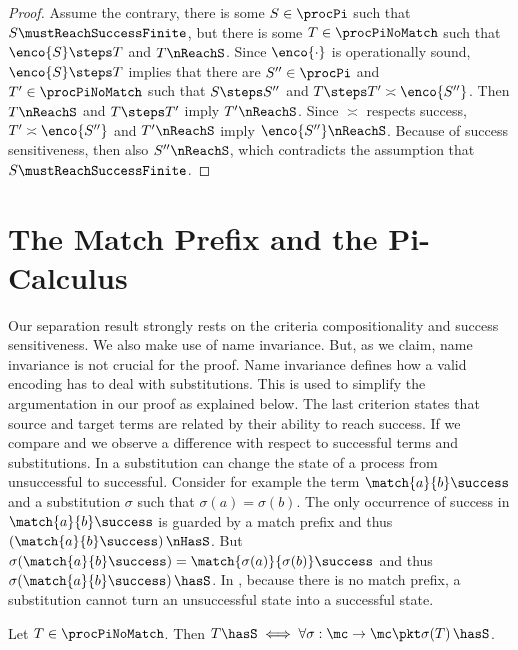 \documentclass[]{article}
\begin{document}
\begin{proof}
	Assume the contrary, \ie there is some $ S \in \procPi $ such that $ S \mustReachSuccessFinite $, but there is some $ T \in \procPiNoMatch $ such that $ \enco{S} \steps T $ and $ T \nReachS $.
	Since $ \enco{\cdot} $ is operationally sound, $ \enco{S} \steps T $ implies that there are $ S'' \in \procPi $ and $ T' \in \procPiNoMatch $ such that $ S \steps S'' $ and $ T \steps T' \asymp \enco{S''} $. Then $ T \nReachS $ and $ T \steps T' $ imply $ T' \nReachS $. Since $ \asymp $ respects success, $ T' \asymp \enco{S''} $ and $ T' \nReachS $ imply $ \enco{S''} \nReachS $. Because of success sensitiveness, then also $ S'' \nReachS $, which contradicts the assumption that $ S\mustReachSuccessFinite $.
\end{proof}



\section{The Match Prefix and the Pi-Calculus}
\label{sec:encodeMatch}

Our separation result strongly rests on the criteria compositionality and success sensitiveness.
We also make use of name invariance.
But, as we claim, name invariance is not crucial for the proof. Name invariance defines how a valid encoding has to deal with substitutions. This is used to simplify the argumentation in our proof as explained below.
The last criterion states that source and target terms are related by their ability to reach success.
If we compare \piT and \piNM we observe a difference with respect to successful terms and substitutions.
In \piT a substitution can change the state of a process from unsuccessful to successful. Consider for example the term $ \match{a}{b}\success $ and a substitution $ \sigma $ such that $ \sigma(a) = \sigma(b) $. The only occurrence of success in $ \match{a}{b}\success $ is guarded by a match prefix and thus $ \left( \match{a}{b}\success \right) \nHasS $. But $ \sigma\!\left( \match{a}{b}\success \right) = \match{\sigma(a)}{\sigma(b)}\success $ and thus $ \sigma\!\left( \match{a}{b}\success \right) \hasS $.
In \piNM, because there is no match prefix, a substitution cannot turn an unsuccessful state into a successful state.

\begin{lemma}
	\label{prop:propequiv}
	Let $ T \in \procPiNoMatch $. Then $ T \hasS \iff \forall \sigma : \mc \to \mc \pkt \sigma\!\left( T \right) \hasS $.
\end{lemma}
\end{document}
